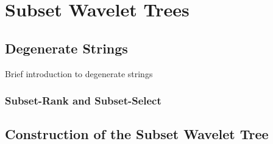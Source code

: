 
\chapter{Subset Wavelet Trees} %

\label{ch:Chapter4} %

\section{Degenerate Strings}
Brief introduction to degenerate strings
\subsection{Subset-Rank and Subset-Select}

\section{Construction of the Subset Wavelet Tree}


